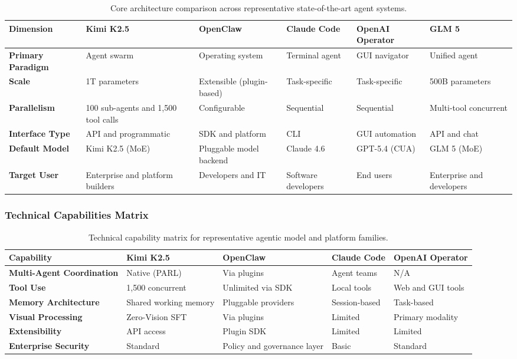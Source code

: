 \begin{table}[htp]
\centering
\footnotesize
\begin{tabularx}{\textwidth}{YYYYYY}
\toprule
\textbf{Dimension} & \textbf{Kimi K2.5} & \textbf{OpenClaw} & \textbf{Claude Code} & \textbf{OpenAI Operator} & \textbf{GLM 5} \\
\midrule
\textbf{Primary Paradigm} & Agent swarm & Operating system & Terminal agent & GUI navigator & Unified agent \\
\textbf{Scale} & 1T parameters & Extensible (plugin-based) & Task-specific & Task-specific & 500B parameters \\
\textbf{Parallelism} & 100 sub-agents and 1,500 tool calls & Configurable & Sequential & Sequential & Multi-tool concurrent \\
\textbf{Interface Type} & API and programmatic & SDK and platform & CLI & GUI automation & API and chat \\
\textbf{Default Model} & Kimi K2.5 (MoE) & Pluggable model backend & Claude 4.6 & GPT-5.4 (CUA) & GLM 5 (MoE) \\
\textbf{Target User} & Enterprise and platform builders & Developers and IT & Software developers & End users & Enterprise and developers \\
\bottomrule
\end{tabularx}
\caption{Core architecture comparison across representative state-of-the-art agent systems.}
\label{tbl:core-architecture-comparison}
\end{table}

\subsubsection{Technical Capabilities Matrix}

\begin{table}[tbp]
\centering
\footnotesize
\begin{tabularx}{\textwidth}{YYYYY}
\toprule
\textbf{Capability} & \textbf{Kimi K2.5} & \textbf{OpenClaw} & \textbf{Claude Code} & \textbf{OpenAI Operator} \\
\midrule
\textbf{Multi-Agent Coordination} & Native (PARL) & Via plugins & Agent teams & N/A \\
\textbf{Tool Use} & 1,500 concurrent & Unlimited via SDK & Local tools & Web and GUI tools \\
\textbf{Memory Architecture} & Shared working memory & Pluggable providers & Session-based & Task-based \\
\textbf{Visual Processing} & Zero-Vision SFT & Via plugins & Limited & Primary modality \\
\textbf{Extensibility} & API access & Plugin SDK & Limited & Limited \\
\textbf{Enterprise Security} & Standard & Policy and governance layer & Basic & Standard \\
\bottomrule
\end{tabularx}
\caption{Technical capability matrix for representative agentic model and platform families.}
\label{tbl:technical-capabilities-matrix}
\end{table}

